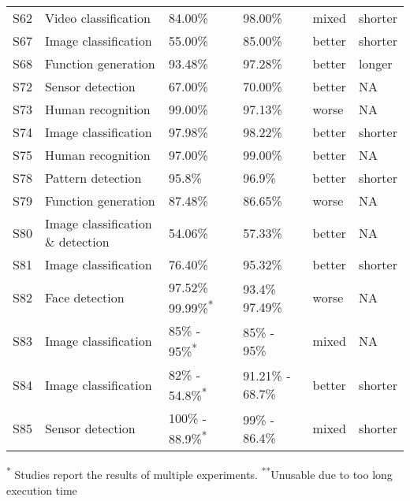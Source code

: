 \documentclass{article}
\begin{document}
\begin{table*}[!htbp]
\begin{tabularx}{\textwidth}{p{.2cm} p{5.1cm}  p{4cm} p{4cm} p{1.5cm} p{1cm} }
S62 	&	 Video classification 			&	 84.00\% 	&	 98.00\% 	&	 mixed 	&	 shorter 	\\
S67 	&	 Image classification 			&	 55.00\% 	&	 85.00\% 	&	 better 	&	 shorter 	\\
S68 	&	 Function generation 			&	 93.48\% 	&	 97.28\% 	&	 better 	&	 longer  	\\
S72 	&	 Sensor detection 			&	 67.00\% 	&	 70.00\% 	&	 better 	&	 NA 	\\
S73 	&	 Human recognition 			&	 99.00\% 	&	 97.13\% 	&	 worse 	&	 NA 	\\
S74 	&	 Image classification 			&	 97.98\% 	&	 98.22\% 	&	 better 	&	 shorter 	\\
S75 	&	 Human recognition 			&	 97.00\% 	&	 99.00\% 	&	 better 	&	 NA 	\\
S78 	&	 Pattern detection 			&	 95.8\% 	&	 96.9\% 	&	 better 	&	 shorter 	\\
S79 	&	 Function generation 			&	 87.48\% 	&	 86.65\% 	&	 worse 	&	 NA 	\\
S80 	&	 Image classification \& detection 			&	 54.06\% 	&	 57.33\% 	&	 better 	&	 NA 	\\
S81 	&	 Image classification 			&	 76.40\% 	&	 95.32\% 	&	 better 	&	 shorter 	\\
S82 	&	 Face detection 			&	 97.52\%  99.99\%\textsuperscript{*} 	&	 93.4\%  97.49\% 	&	 worse 	&	 NA 	\\
S83 	&	 Image classification 			&	 85\% - 95\%\textsuperscript{*} 	&	 85\% - 95\% 	&	 mixed 	&	 NA 	\\
S84 	&	 Image classification 			&	 82\% - 54.8\%\textsuperscript{*} 	&	 91.21\% - 68.7\% 	&	 better 	&	 shorter 	\\
S85 	&	 Sensor detection 			&	 100\% - 88.9\%\textsuperscript{*} 	&	 99\% - 86.4\% 	&	 mixed 	&	 shorter 	\\


\hline
\end{tabularx}

\raggedright  
\textsuperscript{*} Studies report the results of multiple experiments. \textsuperscript{**}Unusable due to too long execution time
\end{table*}
\end{document}
